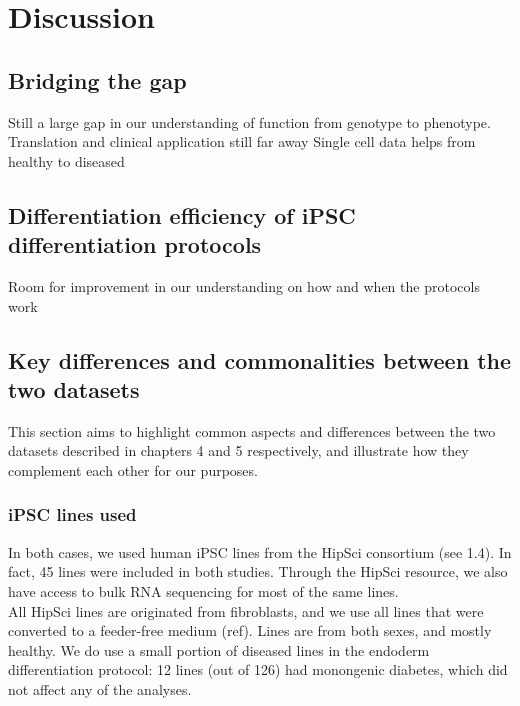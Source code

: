 
\chapter{Discussion}  %

\section{Bridging the gap}

Still a large gap in our understanding of function from genotype to phenotype.
Translation and clinical application still far away
Single cell data helps
from healthy to diseased

\section{Differentiation efficiency of iPSC differentiation protocols}

Room for improvement in our understanding on how and when the protocols work

\section{Key differences and commonalities between the two datasets}

This section aims to highlight common aspects and differences between the two datasets described in chapters 4 and 5 respectively, and illustrate how they complement each other for our purposes.

\subsection{iPSC lines used}
In both cases, we used human iPSC lines from the HipSci consortium (see 1.4). 
In fact, 45 lines were included in both studies.
Through the HipSci resource, we also have access to bulk RNA sequencing for most of the same lines.\\


All HipSci lines are originated from fibroblasts, and we use all lines that were converted to a feeder-free medium (ref).
Lines are from both sexes, and mostly healthy. 
We do use a small portion of diseased lines in the endoderm differentiation protocol: 12 lines (out of 126) had monongenic diabetes, which did not affect any of the analyses. 

